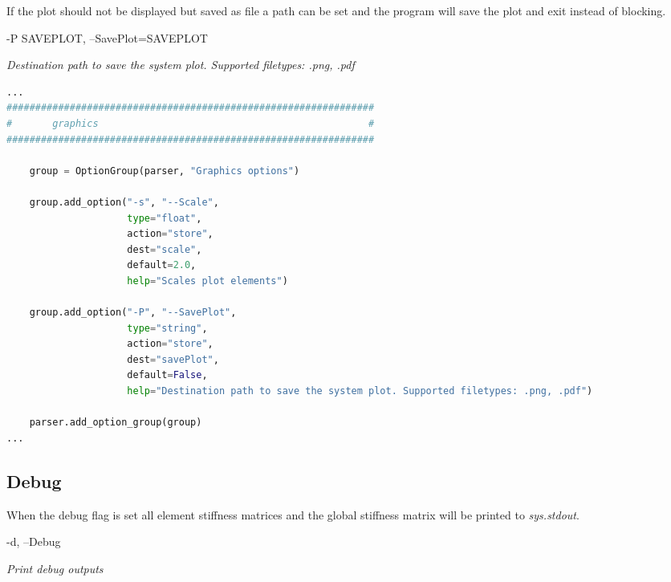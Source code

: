 If the plot should not be displayed but saved as file a path can be set and the program will save the plot and exit instead of blocking.

\begin{addmargin}[2em]{1em}
-P SAVEPLOT, --SavePlot=SAVEPLOT

\textit{Destination path to save the system plot. Supported filetypes: .png, .pdf}
\end{addmargin}

\begin{inconsolata}
\begin{minipage}{\linewidth}
\begin{lstlisting}[language=python]
...
################################################################
#       graphics                                               #
################################################################

    group = OptionGroup(parser, "Graphics options")

    group.add_option("-s", "--Scale",
                     type="float",
                     action="store",
                     dest="scale",
                     default=2.0,
                     help="Scales plot elements")

    group.add_option("-P", "--SavePlot",
                     type="string",
                     action="store",
                     dest="savePlot",
                     default=False,
                     help="Destination path to save the system plot. Supported filetypes: .png, .pdf")

    parser.add_option_group(group)
...
\end{lstlisting}
\end{minipage}
\end{inconsolata}

\subsection{Debug}
\label{subsec:debug}

When the debug flag is set all element stiffness matrices and the global stiffness matrix will be printed to \textit{sys.stdout}.

\begin{addmargin}[2em]{1em}
-d, --Debug

\textit{Print debug outputs}
\end{addmargin}

